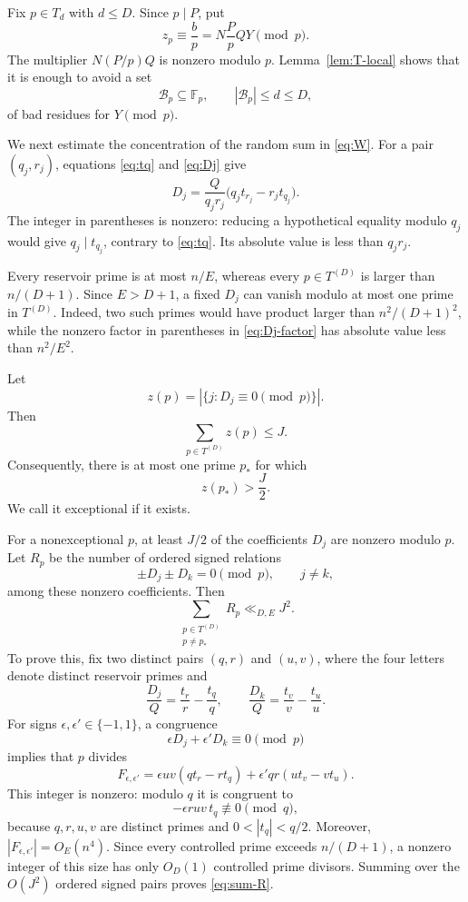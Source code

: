 \documentclass[11pt]{article}
\newcommand{\F}{\mathbb F}
\begin{document}
Fix $p\in T_d$ with $d\leq D$. Since $p\mid P$, put
\[
  z_p\equiv \frac bp
  =N\frac PpQY\pmod p.
\]
The multiplier $N(P/p)Q$ is nonzero modulo $p$. Lemma~\ref{lem:T-local} shows that it is enough to avoid a set
\begin{equation}\label{eq:Bp}
  \mathcal B_p\subseteq\F_p,
  \qquad
  |\mathcal B_p|\leq d\leq D,
\end{equation}
of bad residues for $Y\pmod p$.

We next estimate the concentration of the random sum in \eqref{eq:W}. For a pair $(q_j,r_j)$, equations \eqref{eq:tq} and \eqref{eq:Dj} give
\begin{equation}\label{eq:Dj-factor}
  D_j=\frac{Q}{q_jr_j}
      \bigl(q_jt_{r_j}-r_jt_{q_j}\bigr).
\end{equation}
The integer in parentheses is nonzero: reducing a hypothetical equality modulo $q_j$ would give $q_j\mid t_{q_j}$, contrary to \eqref{eq:tq}. Its absolute value is less than $q_jr_j$.

Every reservoir prime is at most $n/E$, whereas every $p\in T^{(D)}$ is larger than $n/(D+1)$. Since $E>D+1$, a fixed $D_j$ can vanish modulo at most one prime in $T^{(D)}$. Indeed, two such primes would have product larger than $n^2/(D+1)^2$, while the nonzero factor in parentheses in \eqref{eq:Dj-factor} has absolute value less than $n^2/E^2$.

Let
\[
  z(p)=|\{j:D_j\equiv0\pmod p\}|.
\]
Then
\begin{equation}\label{eq:sum-z}
  \sum_{p\in T^{(D)}}z(p)\leq J.
\end{equation}
Consequently, there is at most one prime $p_*$ for which
\begin{equation}\label{eq:exceptional}
  z(p_*)>\frac J2.
\end{equation}
We call it exceptional if it exists.

For a nonexceptional $p$, at least $J/2$ of the coefficients $D_j$ are nonzero modulo $p$. Let $R_p$ be the number of ordered signed relations
\[
  \pm D_j\pm D_k=0\pmod p,
  \qquad j\neq k,
\]
among these nonzero coefficients. Then
\begin{equation}\label{eq:sum-R}
  \sum_{\substack{p\in T^{(D)}\\p\neq p_*}}R_p\ll_{D,E}J^2.
\end{equation}
To prove this, fix two distinct pairs $(q,r)$ and $(u,v)$, where the four letters denote distinct reservoir primes and
\[
  \frac{D_j}{Q}=\frac{t_r}{r}-\frac{t_q}{q},
  \qquad
  \frac{D_k}{Q}=\frac{t_v}{v}-\frac{t_u}{u}.
\]
For signs $\epsilon,\epsilon'\in\{-1,1\}$, a congruence
\[
  \epsilon D_j+\epsilon'D_k\equiv0\pmod p
\]
implies that $p$ divides
\begin{equation}\label{eq:relation-integer}
  F_{\epsilon,\epsilon'}
  =\epsilon uv(qt_r-rt_q)+\epsilon'qr(ut_v-vt_u).
\end{equation}
This integer is nonzero: modulo $q$ it is congruent to
\[
  -\epsilon ruv\,t_q\not\equiv0\pmod q,
\]
because $q,r,u,v$ are distinct primes and $0<|t_q|<q/2$. Moreover,
$|F_{\epsilon,\epsilon'}|=O_E(n^4)$. Since every controlled prime exceeds $n/(D+1)$, a nonzero integer of this size has only $O_D(1)$ controlled prime divisors. Summing over the $O(J^2)$ ordered signed pairs proves \eqref{eq:sum-R}.
\end{document}
